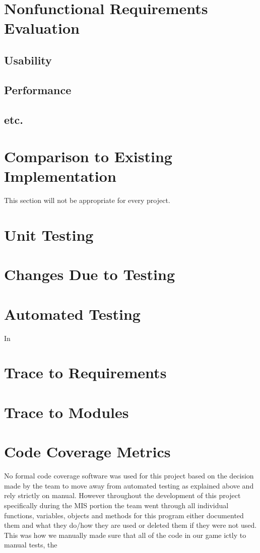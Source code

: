 \documentclass[12pt, titlepage]{article}
\begin{document}
\section{Nonfunctional Requirements Evaluation}

\subsection{Usability}

\subsection{Performance}

\subsection{etc.}

\section{Comparison to Existing Implementation}

This section will not be appropriate for every project.

\section{Unit Testing}

\section{Changes Due to Testing}

\section{Automated Testing}
In

\section{Trace to Requirements}

\section{Trace to Modules}

\section{Code Coverage Metrics}
No formal code coverage software was used for this project based on the decision made by the team to move away from automated testing as explained above and rely strictly on manual. However throughout the development of this project specifically during the MIS portion the team went through all individual functions, variables, objects and methods for this program either documented them and what they do/how they are used or deleted them if they were not used. This was how we manually made sure that all of the code in our game ictly to manual tests, the





\end{document}
